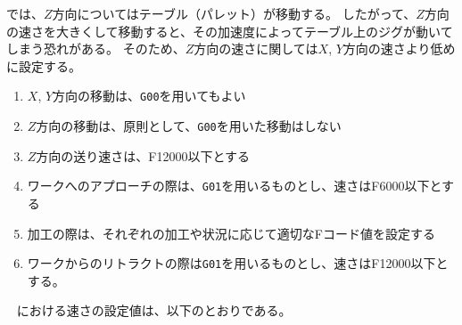 \clearpage
\DMname では、$Z$方向についてはテーブル（パレット）が移動する。
したがって、$Z$方向の速さを大きくして移動すると、その加速度によってテーブル上のジグが動いてしまう恐れがある。
そのため、$Z$方向の速さに関しては$X$, $Y$方向の速さより低めに設定する。
\begin{enumerate}[label=\Roman*., ref=\Roman*]
\item $X$, $Y$方向の移動は、\verb|G00|を用いてもよい
\item $Z$方向の移動は、原則として、\verb|G00|を用いた移動はしない
\item $Z$方向の送り速さは、F12000以下とする
\item ワークへのアプローチの際は、\verb|G01|を用いるものとし、速さはF6000以下とする
\item 加工の際は、それぞれの加工や状況に応じて適切なFコード値を設定する
\item ワークからのリトラクトの際は\verb|G01|を用いるものとし、速さはF12000以下とする。
\end{enumerate}


~\newline\noindent
\dateKouguSpeed における速さの設定値は、以下のとおりである。\\

